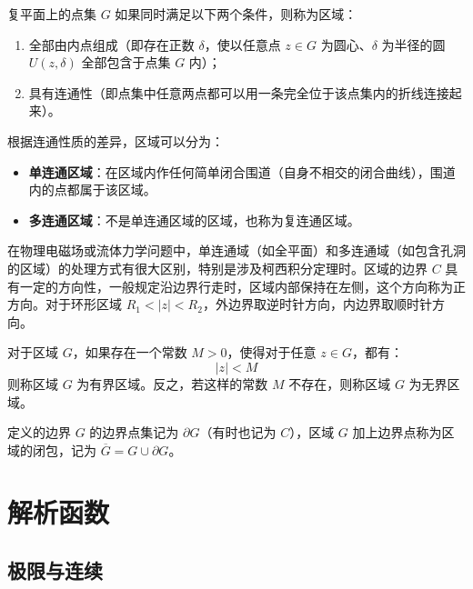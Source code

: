 \begin{definition}[区域]
复平面上的点集 \(G\) 如果同时满足以下两个条件，则称为区域：
\begin{enumerate}
    \item 全部由内点组成（即存在正数 \(\delta\)，使以任意点 \(z \in G\) 为圆心、\(\delta\) 为半径的圆 \(U(z, \delta)\) 全部包含于点集 \(G\) 内）；
    \item 具有连通性（即点集中任意两点都可以用一条完全位于该点集内的折线连接起来）。
\end{enumerate}
\end{definition}

\begin{definition}[单连域与多连域]
根据连通性质的差异，区域可以分为：
\begin{itemize}
    \item \textbf{单连通区域}：在区域内作任何简单闭合围道（自身不相交的闭合曲线），围道内的点都属于该区域。
    \item \textbf{多连通区域}：不是单连通区域的区域，也称为复连通区域。
\end{itemize}
\end{definition}

\begin{remark}
在物理电磁场或流体力学问题中，单连通域（如全平面）和多连通域（如包含孔洞的区域）的处理方式有很大区别，特别是涉及柯西积分定理时。区域的边界 \(C\) 具有一定的方向性，一般规定沿边界行走时，区域内部保持在左侧，这个方向称为正方向。对于环形区域 \(R_1 < |z| < R_2\)，外边界取逆时针方向，内边界取顺时针方向。
\end{remark}

\begin{definition}[有界区域与无界区域]
对于区域 \(G\)，如果存在一个常数 \(M > 0\)，使得对于任意 \(z \in G\)，都有：
\[
|z| < M
\]
则称区域 \(G\) 为有界区域。反之，若这样的常数 \(M\) 不存在，则称区域 \(G\) 为无界区域。
\end{definition}

\begin{remark}
定义的边界 \(G\) 的边界点集记为 \(\partial G\)（有时也记为 \(C\)），区域 \(G\) 加上边界点称为区域的闭包，记为 \(\overline{G} = G \cup \partial G\)。
\end{remark}

\chapter{解析函数}

\section{极限与连续}

